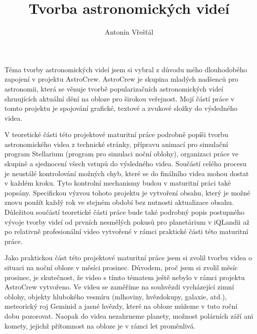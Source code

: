 \documentclass[12pt, a4]{article}
\author{Antonín Vřešťál}
\title{Tvorba astronomických videí}
\begin{document}
\maketitle
Téma tvorby astronomických videí jsem si vybral z důvodu mého dlouhodobého zapojení v projektu AstroCrew. AstroCrew je skupina mladých nadšenců pro astronomii, která se věnuje tvorbě popularizačních astronomických videí shrnujících aktuální dění na obloze pro širokou veřejnost. Mojí částí práce v tomto projektu je spojování grafické, textové a zvukové složky do výsledného videa. 

V teoretické části této projektové maturitní práce podrobně popíši tvorbu astronomického videa z technické stránky, přípravu animací pro simulační program Stellarium (program pro simulaci noční oblohy), organizaci práce ve skupině a sjednocení všech vstupů do výsledného videa. Součástí celého procesu je neustálé kontrolování možných chyb, které se do finálního videa mohou dostat v každém kroku. Tyto kontrolní mechanismy budou v maturitní práci také popsány. Specifickou výzvou tohoto projektu je vytvoření obsahu, který je možné znovu použít každý rok ve stejném období bez nutnosti aktualizace obsahu. Důležitou součástí teoretické části práce bude také podrobný popis postupného vývoje tvorby videí od prvních nesmělých pokusů pro planetárium v iQLandii až po relativně profesionální video vytvořené v rámci praktické části této maturitní práce.

Jako praktickou část této projektové maturitní práce jsem si zvolil tvorbu videa o situaci na noční obloze v měsíci prosinec. Důvodem, proč jsem si zvolil měsíc prosinec, je skutečnost, že video s tímto tématem ještě nebylo v rámci projektu AstroCrew vytvořeno. Ve videu se zaměříme na souhvězdí vycházející zimní oblohy, objekty hlubokého vesmíru (mlhoviny, hvězdokupy, galaxie, atd.), meteorický roj Geminid a jasné hvězdy, které na obloze můžeme v tuto roční dobu pozorovat. Naopak do videa nezahrneme planety, možnost polárních září ani komety, jejichž přítomnost na obloze je v rámci let proměnlivá.
\end{document}
